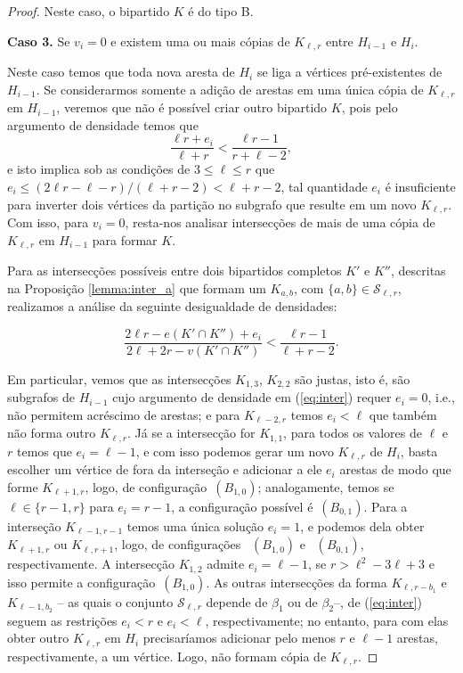 \documentclass[12pt,a4paper]{book}
\newcommand{\K}{K_{\ell,r}} %
\newcommand{\Slr}{\mathcal{S}_{\ell,r}} %
\begin{document}
\begin{proof}
    Neste caso, o bipartido $K$ é do tipo B.
   
 \medskip \textbf{Caso 3.} 
	  Se $v_i = 0$ e existem uma ou mais cópias de $\K$ entre $H_{i-1}$ e $H_i$. 
	  
	 Neste caso temos que toda nova aresta de $H_i$ se liga a vértices pré-existentes de $H_{i-1}$. 
      Se considerarmos somente a adição de arestas em uma única cópia de $\K$ em $H_{i-1}$, veremos que não é possível criar outro bipartido $K$, pois pelo argumento de densidade temos que
    \[ 
		\frac{\ell r + e_i}{\ell+r} < \frac{\ell r-1}{r+\ell-2},
    \]
	e isto implica sob as condições de $3 \leq \ell \leq r$ que 
	$e_i \leq (2\ell r -\ell-r)/(\ell+r-2) < \ell+r-2$, 
	tal quantidade $e_i$ é insuficiente para inverter dois vértices da partição no subgrafo que resulte em um novo $\K$.
    Com isso, para $v_i=0$, resta-nos analisar intersecções de mais de uma cópia de $\K$ em $H_{i-1}$ para formar $K$.
    
    Para as intersecções possíveis entre dois bipartidos completos $K'$ e $K''$, descritas na Proposição \ref{lemma:inter_a} que formam um $K_{a,b}$, com $\{a,b\} \in \Slr$, realizamos a  análise da seguinte desigualdade de densidades:

    \begin{equation}\label{eq:inter}
        \frac{2\ell r - e(K'\cap K'') + e_i}{2\ell+2r - v(K' \cap K'')} < \frac{\ell r- 1}{\ell+r-2}.
    \end{equation}
	    
     Em particular, vemos que as intersecções $K_{1,3}$, $K_{2,2}$ são  justas, isto é, são subgrafos de $H_{i-1}$ cujo argumento de densidade em (\ref{eq:inter}) requer $e_i=0$, i.e., não permitem acréscimo de arestas;
    e para $K_{\ell-2,r}$ temos $e_i < \ell$ que também não forma outro $\K$.
     Já se a intersecção for $K_{1,1}$, para todos os valores de $\ell$ e $r$ temos que $e_i = \ell-1$, e com isso podemos gerar um novo $\K$ de $H_{i}$, basta escolher um vértice de fora da interseção e adicionar a ele $e_i$ arestas de modo que forme $K_{\ell+1,r}$, logo, de configuração~\hyperref[configB]{$(B_{1,0})$}; analogamente, temos se $\ell \in
        \{r-1, r\}$ para $e_i = r-1$, a configuração possível é~\hyperref[configB]{$(B_{0,1})$}.
    Para a interseção $K_{\ell-1, r-1}$ temos uma única solução $e_i=1$, e podemos dela obter $K_{\ell+1, r}$ ou $K_{\ell,r+1}$, logo, de configurações ~\hyperref[configB]{$(B_{1,0})$}
    e ~\hyperref[configB]{$(B_{0,1})$}, respectivamente.
     A intersecção $K_{1,2}$ admite $e_i = \ell-1$, se $r > \ell^2 - 3\ell+3$ e isso permite a configuração~\hyperref[configB]{$(B_{1,0})$}.
    As outras intersecções da forma $K_{\ell, r-b_1}$ e $K_{\ell-1,b_2}$ -- as quais o conjunto $\Slr$ depende de $\beta_1$ ou de $\beta_2$--,  de (\ref{eq:inter}) seguem as restrições $e_i < r$ e $e_i < \ell$, respectivamente; no entanto,
	para com elas obter outro $\K$ em $H_i$ precisaríamos adicionar pelo menos
	$r$ e $\ell-1$ arestas, respectivamente, a um vértice. Logo, não formam cópia de $\K$. 
    

\end{proof}
\end{document}
